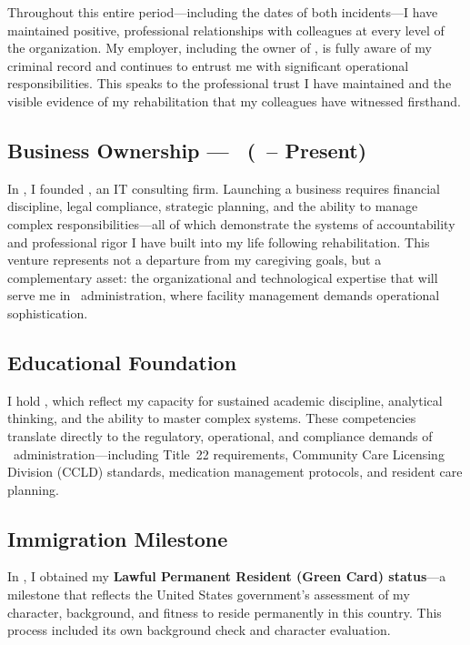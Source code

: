 Throughout this entire period---including the dates of both incidents---I have maintained positive, professional relationships with colleagues at every level of the organization. My employer, including the owner of \EmployerName, is fully aware of my criminal record and continues to entrust me with significant operational responsibilities. This speaks to the professional trust I have maintained and the visible evidence of my rehabilitation that my colleagues have witnessed firsthand.

\subsection{Business Ownership --- \LLCName\ (\LLCDate\ -- Present)}

In \LLCDate, I founded \textbf{\LLCName}, an IT consulting firm. Launching a business requires financial discipline, legal compliance, strategic planning, and the ability to manage complex responsibilities---all of which demonstrate the systems of accountability and professional rigor I have built into my life following rehabilitation. This venture represents not a departure from my caregiving goals, but a complementary asset: the organizational and technological expertise that will serve me in \FacilityTypeShort\ administration, where facility management demands operational sophistication.

\subsection{Educational Foundation}

I hold \textbf{\EducationDegrees}, which reflect my capacity for sustained academic discipline, analytical thinking, and the ability to master complex systems. These competencies translate directly to the regulatory, operational, and compliance demands of \FacilityTypeShort\ administration---including Title~22 requirements, Community Care Licensing Division (CCLD) standards, medication management protocols, and resident care planning.

\subsection{Immigration Milestone}

In \GreenCardYear, I obtained my \textbf{Lawful Permanent Resident (Green Card) status}---a milestone that reflects the United States government's assessment of my character, background, and fitness to reside permanently in this country. This process included its own background check and character evaluation.

